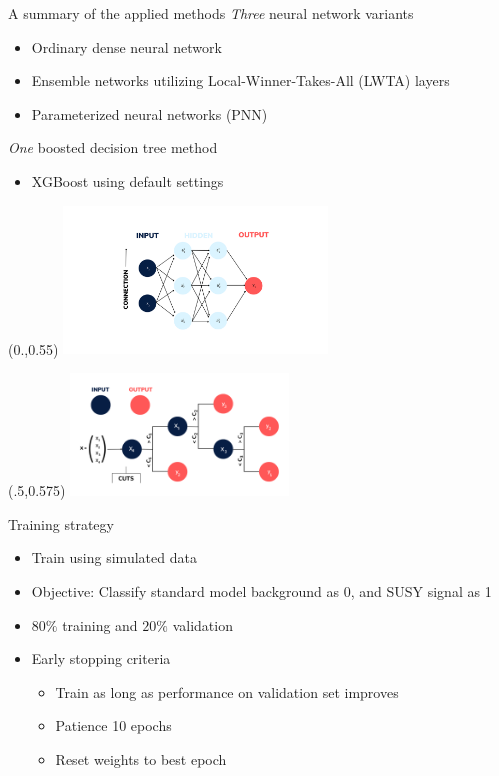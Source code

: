 \documentclass[UKenglish]{beamer}
\begin{document}
\begin{frame}{A summary of the applied methods}
    \emph{Three} neural network variants
    \begin{itemize}
        \item Ordinary dense neural network
        \item Ensemble networks utilizing Local-Winner-Takes-All (LWTA) layers
        \item Parameterized neural networks (PNN)
    \end{itemize}
    \emph{One} boosted decision tree method
    \begin{itemize}
        \item XGBoost using default settings
    \end{itemize}
    \begin{textblock}{1}(0.,0.55)
        \includegraphics[width=0.525\textwidth]{figures/Input_labels.png}
    \end{textblock}
    \begin{textblock}{1}(.5,0.575)
        \includegraphics[width=0.435\textwidth]{figures/DT.png}
    \end{textblock}
\end{frame}

\begin{frame}{Training strategy}
    \begin{itemize}
        \item Train using simulated data 
        \item Objective: Classify standard model background as 0, and SUSY signal as 1
        \item $80\%$ training and $20\%$ validation 
        \item Early stopping criteria
        \begin{itemize}
            \item Train as long as performance on validation set improves 
            \item Patience 10 epochs
            \item Reset weights to best epoch
        \end{itemize}
    \end{itemize}
\end{frame}
\end{document}

